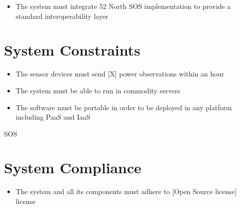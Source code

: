 \begin{itemize}
	\item The system must integrate 52 North SOS implementation to provide a standard interoperability layer
\end{itemize}

\section{System Constraints}

\begin{itemize}
	\item The sensor devices must send [X] power observations within an hour
	\item The system must be able to run in commodity servers 
	\item The software must be portable in order to be deployed in any platform including PaaS and IaaS
\end{itemize}

SOS

\section{System Compliance}

\begin{itemize}
	\item The system and all its components must adhere to [Open Source license] license
\end{itemize}



